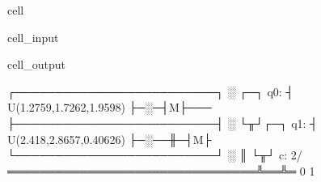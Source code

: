 \documentclass[letterpaper,10pt,english]{jupyterBook}
\begin{document}
\begin{sphinxuseclass}{cell}
\begin{sphinxVerbatimInput}
\begin{sphinxuseclass}{cell_input}
\begin{sphinxVerbatim}[commandchars=\\\{\}]

\end{sphinxVerbatim}

\end{sphinxuseclass}\end{sphinxVerbatimInput}
\begin{sphinxVerbatimOutput}

\begin{sphinxuseclass}{cell_output}
\begin{sphinxVerbatim}[commandchars=\\\{\}]
     ┌─────────────────────────┐ ░ ┌─┐
q\PYGZus{}0: ┤ U(1.2759,1.7262,1.9598) ├─░─┤M├───
     ├─────────────────────────┤ ░ └╥┘┌─┐
q\PYGZus{}1: ┤ U(2.418,2.8657,0.40626) ├─░──╫─┤M├
     └─────────────────────────┘ ░  ║ └╥┘
c: 2/═══════════════════════════════╩══╩═
                                    0  1
\end{sphinxVerbatim}

\end{sphinxuseclass}\end{sphinxVerbatimOutput}

\end{sphinxuseclass}
\end{document}
